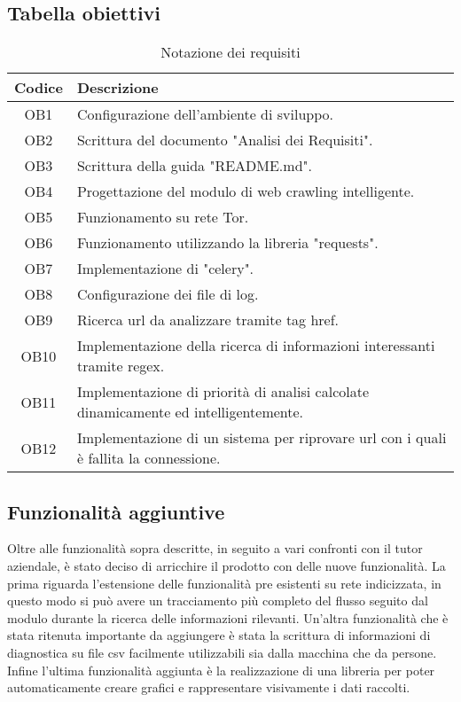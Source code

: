 \subsection{Tabella obiettivi}

\begin{table}[!htbp]
  \centering
    \begin{tabularx}{\textwidth}{cX}
    \toprule
    \textbf{Codice}	&	\textbf{Descrizione} \\
    \midrule
    OB1			&	Configurazione dell'ambiente di sviluppo. \\  
	\hline
    OB2			&	Scrittura del documento "Analisi dei Requisiti". \\ 
	\hline
    OB3			&	Scrittura della guida "README.md". \\
    \hline
    OB4			&	Progettazione del modulo di web crawling intelligente. \\
    OB5			&	Funzionamento su rete Tor. \\
    \hline
    OB6			&	Funzionamento utilizzando la libreria "requests". \\
    \hline
    OB7			&	Implementazione di "celery". \\
    \hline
    OB8			&	Configurazione dei file di log. \\
    \hline
    OB9			&	Ricerca url da analizzare tramite tag href. \\
    \hline
    OB10		&	Implementazione della ricerca di informazioni interessanti tramite regex. \\
    \hline
    OB11		&	Implementazione di priorità di analisi calcolate dinamicamente ed intelligentemente. \\
    \hline
    OB12		&	Implementazione di un sistema per riprovare url con i quali è fallita la connessione. \\
        
    \bottomrule
    \end{tabularx}%
  \label{tab:notazione-requisiti}%
  \caption{Notazione dei requisiti}
\end{table}%

\subsection{Funzionalità aggiuntive}

Oltre alle funzionalità sopra descritte, in seguito a vari confronti con il tutor aziendale, è stato deciso di arricchire il prodotto con delle nuove funzionalità. \newline{}
La prima riguarda l'estensione delle funzionalità pre esistenti su rete indicizzata, in questo modo si può avere un tracciamento più completo del flusso seguito dal modulo durante la ricerca delle informazioni rilevanti. Un'altra funzionalità che è stata ritenuta importante da aggiungere è stata la scrittura di informazioni di diagnostica su file csv facilmente utilizzabili sia dalla macchina che da persone. \newline{} Infine l'ultima funzionalità aggiunta è la realizzazione di una libreria per poter automaticamente creare grafici e rappresentare visivamente i dati raccolti.


